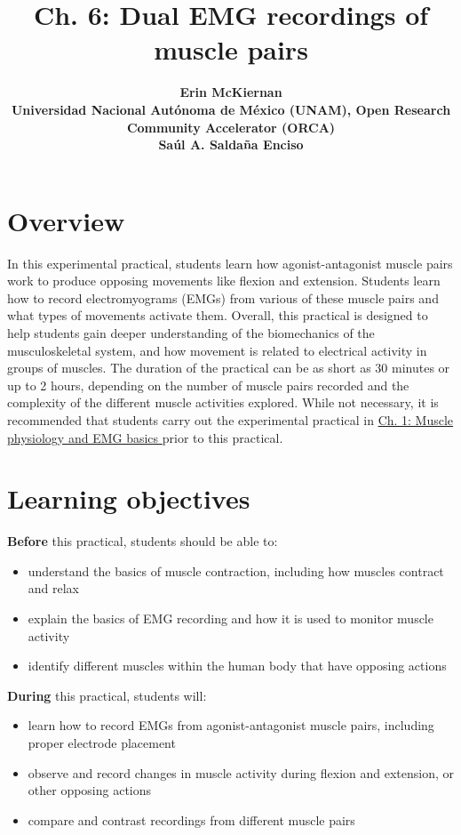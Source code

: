 \documentclass{article}
\title{Ch. 6: Dual EMG recordings of muscle pairs}
\date{\displaydate{articleDate}}
\author{\bfseries Erin McKiernan\mdseries\\Universidad Nacional Autónoma de México (UNAM), Open Research Community Accelerator (ORCA)\\\AND\bfseries Saúl A. Saldaña Enciso\mdseries\\}
\begin{document}
\maketitle
\keywords{}

\section{Overview}

In this experimental practical, students learn how agonist-antagonist muscle pairs work to produce opposing movements like flexion and extension. Students learn how to record electromyograms (EMGs) from various of these muscle pairs and what types of movements activate them. Overall, this practical is designed to help students gain deeper understanding of the biomechanics of the musculoskeletal system, and how movement is related to electrical activity in groups of muscles. The duration of the practical can be as short as 30 minutes or up to 2 hours, depending on the number of muscle pairs recorded and the complexity of the different muscle activities explored. While not necessary, it is recommended that students carry out the experimental practical in \href{https://curvenote.com/oxa:EPpXta8zJdzN048lz8AR/hZTnTYzQR5EQmCKX51Wj}{Ch. 1: Muscle physiology and EMG basics }prior to this practical.

\section{Learning objectives}

\textbf{Before} this practical, students should be able to:

\begin{itemize}
\item understand the basics of muscle contraction, including how muscles contract and relax
\item explain the basics of EMG recording and how it is used to monitor muscle activity
\item identify different muscles within the human body that have opposing actions
\end{itemize}

\textbf{During} this practical, students will:

\begin{itemize}
\item learn how to record EMGs from agonist-antagonist muscle pairs, including proper electrode placement
\item observe and record changes in muscle activity during flexion and extension, or other opposing actions
\item compare and contrast recordings from different muscle pairs
\end{itemize}
\end{document}
